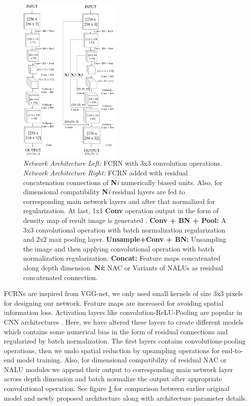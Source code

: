 \documentclass[conference]{IEEEtran}
\begin{document}
\begin{figure}[!h]
\centering
\includegraphics[width=0.45\textwidth]{fcrn-abstract.png}
\caption{\textit{Network Architecture Left: }FCRN with 3x3 convolution operations. \textit{Network Architecture Right: } FCRN added with residual concatenation connections of \textbf{N}\textit{i} numerically biased units. Also, for dimensional compatibility \textbf{N}\textit{i} residual layers are fed to corresponding main network layers and after that normalized for regularization. At last, 1x1 \textbf{Conv} operation output in the form of density map of result image is generated .\newline
\textbf{Conv + BN + Pool: }A 3x3 convolutional operation with batch normalization regularization and  2x2 max pooling layer.\newline
\textbf{Unsample+Conv + BN: }Unsampling the image and then applying convolutional operation with batch normalization regularization.\newline
\textbf{Concat: }Feature maps concatenated along depth dimension.\newline
\textbf{N\textit{i}: }NAC or Variants of NALUs as residual concatenated connection.
}
\label{fig8}
\end{figure}

FCRNs are inspired from VGG-net, we only used small kernels of size 3x3 pixels for designing our network. Feature maps are increased for avoiding spatial information loss. Activation layers like convolution-ReLU-Pooling are popular in CNN architectures \cite{b24}. Here, we have altered these layers to create different models which contains some numerical bias in the form of residual connections and regularized by batch normalization. The first layers contains convolutions-pooling operations, then we undo spatial reduction by upsampling operations for end-to-end model training. Also, for dimensional compatibility of residual NAC or NALU modules we append their output to corresponding main network layer across depth dimension and batch normalize the output after appropriate convolutional operation. See figure \ref{fig8} for comparison between earlier original model and newly proposed architecture along with architecture parameter details.
\end{document}
